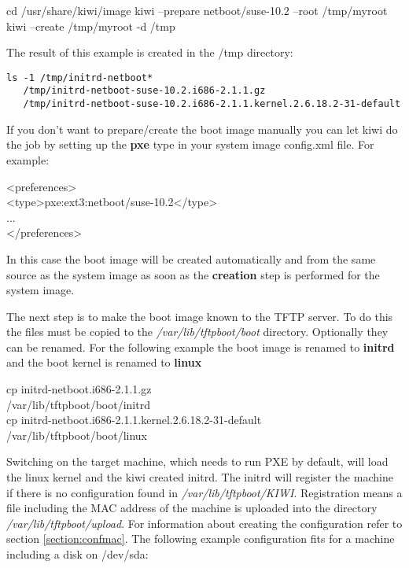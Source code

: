 \begin{Command}{13cm}
	cd /usr/share/kiwi/image
	kiwi --prepare netboot/suse-10.2 --root /tmp/myroot\\
	kiwi --create /tmp/myroot -d /tmp
\end{Command}

The result of this example is created in the /tmp directory:

\begin{verbatim}
ls -1 /tmp/initrd-netboot*
   /tmp/initrd-netboot-suse-10.2.i686-2.1.1.gz
   /tmp/initrd-netboot-suse-10.2.i686-2.1.1.kernel.2.6.18.2-31-default
\end{verbatim} 

If you don't want to prepare/create the boot image manually you
can let kiwi do the job by setting up the \textbf{pxe} type in your
system image config.xml file. For example:

\begin{Command}{12cm}
<preferences>\\
\hspace*{1cm}<type>pxe:ext3:netboot/suse-10.2</type>\\
\hspace*{1cm}...\\
</preferences>
\end{Command}

In this case the boot image will be created automatically and from
the same source as the system image as soon as the \textbf{creation}
step is performed for the system image.

The next step is to make the boot image known to the TFTP server.
To do this the files must be copied to the \textit{/var/lib/tftpboot/boot}
directory. Optionally they can be renamed. For the following
example the boot image is renamed to \textbf{initrd} and the boot kernel
is renamed to \textbf{linux}

\begin{Command}{13cm}
	cp initrd-netboot.i686-2.1.1.gz \bs \\
	\hspace*{2cm}/var/lib/tftpboot/boot/initrd\\
	cp initrd-netboot.i686-2.1.1.kernel.2.6.18.2-31-default \bs \\
	\hspace*{2cm}/var/lib/tftpboot/boot/linux\\
\end{Command}

Switching on the target machine, which needs to run PXE by default,
will load the linux kernel and the kiwi created initrd.
The initrd will register the machine if there is no configuration
found in \textit{/var/lib/tftpboot/KIWI}. Registration means a file
including the MAC address of the machine is uploaded into the directory
\textit{/var/lib/tftpboot/upload}. For information about creating the
configuration refer to section \ref{section:confmac}. The following
example configuration fits for a machine including a disk on /dev/sda:

